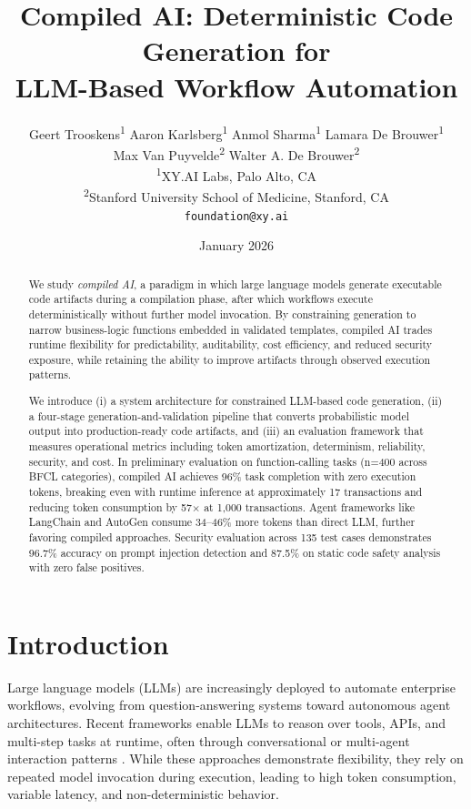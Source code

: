\documentclass[11pt]{article}
\title{Compiled AI: Deterministic Code Generation for\\LLM-Based Workflow Automation}
\author{
  Geert Trooskens\textsuperscript{1} \quad
  Aaron Karlsberg\textsuperscript{1} \quad
  Anmol Sharma\textsuperscript{1} \quad
  Lamara De Brouwer\textsuperscript{1} \\[0.3em]
  Max Van Puyvelde\textsuperscript{2} \quad
  Walter A. De Brouwer\textsuperscript{2}
  \\[1em]
  \textsuperscript{1}XY.AI Labs, Palo Alto, CA \\
  \textsuperscript{2}Stanford University School of Medicine, Stanford, CA \\[0.5em]
  \texttt{foundation@xy.ai}
}
\date{January 2026}
\begin{document}
\maketitle

\begin{abstract}

We study \emph{compiled AI}, a paradigm in which large language models generate executable code artifacts during a compilation phase, after which workflows execute deterministically without further model invocation. By constraining generation to narrow business-logic functions embedded in validated templates, compiled AI trades runtime flexibility for predictability, auditability, cost efficiency, and reduced security exposure, while retaining the ability to improve artifacts through observed execution patterns.

We introduce (i) a system architecture for constrained LLM-based code generation, (ii) a four-stage generation-and-validation pipeline that converts probabilistic model output into production-ready code artifacts, and (iii) an evaluation framework that measures operational metrics including token amortization, determinism, reliability, security, and cost. In preliminary evaluation on function-calling tasks (n=400 across BFCL categories), compiled AI achieves 96\% task completion with zero execution tokens, breaking even with runtime inference at approximately 17 transactions and reducing token consumption by 57$\times$ at 1,000 transactions. Agent frameworks like LangChain and AutoGen consume 34--46\% more tokens than direct LLM, further favoring compiled approaches. Security evaluation across 135 test cases demonstrates 96.7\% accuracy on prompt injection detection and 87.5\% on static code safety analysis with zero false positives.

\end{abstract}

\section{Introduction}
\label{sec:introduction}

Large language models (LLMs) are increasingly deployed to automate enterprise workflows, evolving from question-answering systems toward autonomous agent architectures. Recent frameworks enable LLMs to reason over tools, APIs, and multi-step tasks at runtime, often through conversational or multi-agent interaction patterns \citep{autogen2024, crewai2024, langchain2022}. While these approaches demonstrate flexibility, they rely on repeated model invocation during execution, leading to high token consumption, variable latency, and non-deterministic behavior.
\end{document}
